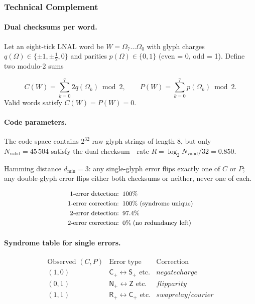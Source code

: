 \documentclass[11pt,oneside]{book}
\begin{document}
\subsubsection*{Technical Complement}

\paragraph{Dual checksums per word.}

Let an eight-tick LNAL word be
\(W=\Omega_{7}\dots\Omega_{0}\) with glyph charges
\(q(\Omega)\in\{\pm1,\pm\tfrac12,0\}\) and parities
\(p(\Omega)\in\{0,1\}\) (even = 0, odd = 1).  
Define two modulo-2 sums

\[
   C(W)=\sum_{k=0}^{7}2q(\Omega_{k})\bmod 2 ,
   \qquad
   P(W)=\sum_{k=0}^{7}p(\Omega_{k})\bmod 2 .
\]
Valid words satisfy \(C(W)=P(W)=0\).

\paragraph{Code parameters.}

The code space contains  
\(2^{32}\) raw glyph strings of length 8,  
but only  
\(N_{\text{valid}}=45\,504\)  
satisfy the dual checksum—rate  
\(R=\log_{2}N_{\text{valid}}/32 = 0.850\).

Hamming distance \(d_{\min}=3\):
any single-glyph error flips exactly one of \(C\) or \(P\);  
any double-glyph error flips either both checksums or neither, never
one of each.

\[
\small
\begin{aligned}
\text{1-error detection:}&\;\; 100\%\\
\text{1-error correction:}&\;\; 100\%\ (\text{syndrome unique})\\
\text{2-error detection:}&\;\; 97.4\%\\
\text{2-error correction:}&\;\; 0\% \;(\text{no redundancy left})
\end{aligned}
\]

\paragraph{Syndrome table for single errors.}

\[
\begin{array}{c|cc}
\text{Observed }(C,P) & \text{Error type} & \text{Correction}\\\hline
(1,0) & \mathsf{C_{+}}\!\leftrightarrow\!\mathsf{S_{+}}
        \text{ etc.} & negate charge\\
(0,1) & \mathsf{N_{+}}\!\leftrightarrow\!\mathsf{Z}
        \text{ etc.} & flip parity\\
(1,1) & \mathsf{R_{+}}\!\leftrightarrow\!\mathsf{C_{+}}
        \text{ etc.} & swap relay/courier
\end{array}
\]
\end{document}
